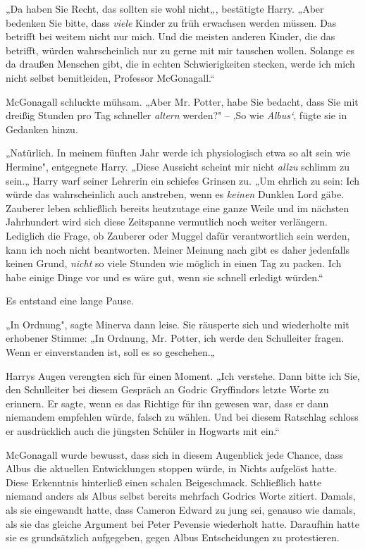 {„Da haben Sie Recht, das sollten sie wohl nicht„, bestätigte Harry. „Aber bedenken Sie bitte, dass \emph{viele} Kinder zu früh erwachsen werden müssen. Das betrifft bei weitem nicht nur mich. Und die meisten anderen Kinder, die das betrifft, würden wahrscheinlich nur zu gerne mit mir tauschen wollen. Solange es da draußen Menschen gibt, die in echten Schwierigkeiten stecken, werde ich mich nicht selbst bemitleiden, Professor McGonagall.“

McGonagall schluckte mühsam. „Aber Mr. Potter, habe Sie bedacht, dass Sie mit dreißig Stunden pro Tag schneller \emph{altern} werden?" -- ‚So wie \emph{Albus`}, fügte sie in Gedanken hinzu.

„Natürlich. In meinem fünften Jahr werde ich physiologisch etwa so alt sein wie Hermine", entgegnete Harry. „Diese Aussicht scheint mir nicht \emph{allzu} schlimm zu sein.„ Harry warf seiner Lehrerin ein schiefes Grinsen zu. „Um ehrlich zu sein: Ich würde das wahrscheinlich auch anstreben, wenn es \emph{keinen} Dunklen Lord gäbe. Zauberer leben schließlich bereits heutzutage eine ganze Weile und im nächsten Jahrhundert wird sich diese Zeitspanne vermutlich noch weiter verlängern. Lediglich die Frage, ob Zauberer oder Muggel dafür verantwortlich sein werden, kann ich noch nicht beantworten. Meiner Meinung nach gibt es daher jedenfalls keinen Grund, \emph{nicht} so viele Stunden wie möglich in einen Tag zu packen. Ich habe einige Dinge vor und es wäre gut, wenn sie schnell erledigt würden.“

Es entstand eine lange Pause.

„In Ordnung", sagte Minerva dann leise. Sie räusperte sich und wiederholte mit erhobener Stimme: „In Ordnung, Mr. Potter, ich werde den Schulleiter fragen. Wenn er einverstanden ist, soll es so geschehen.„

Harrys Augen verengten sich für einen Moment. „Ich verstehe. Dann bitte ich Sie, den Schulleiter bei diesem Gespräch an Godric Gryffindors letzte Worte zu erinnern. Er sagte, wenn es das Richtige für ihn gewesen war, dass er dann niemandem empfehlen würde, falsch zu wählen. Und bei diesem Ratschlag schloss er ausdrücklich auch die jüngsten Schüler in Hogwarts mit ein.“

McGonagall wurde bewusst, dass sich in diesem Augenblick jede Chance, dass Albus die aktuellen Entwicklungen stoppen würde, in Nichts aufgelöst hatte. Diese Erkenntnis hinterließ einen schalen Beigeschmack. Schließlich hatte niemand anders als Albus selbst bereits mehrfach Godrics Worte zitiert. Damals, als sie eingewandt hatte, dass Cameron Edward zu jung sei, genauso wie damals, als sie das gleiche Argument bei Peter Pevensie wiederholt hatte. Daraufhin hatte sie es grundsätzlich aufgegeben, gegen Albus Entscheidungen zu protestieren.

}
